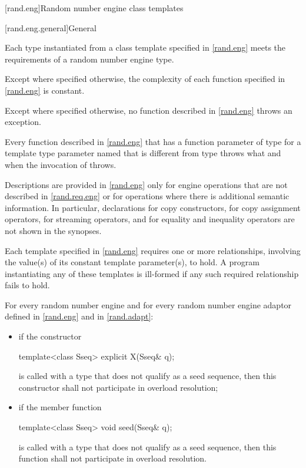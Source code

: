 [rand.eng]{Random number engine class templates}%

[rand.eng.general]{General}%

\pnum
Each type instantiated
from a class template specified in \ref{rand.eng}
meets the requirements
of a random number engine type.

\pnum
Except where specified otherwise,
the complexity of each function
specified in \ref{rand.eng}
is constant.

\pnum
Except where specified otherwise,
no function described in \ref{rand.eng}
throws an exception.

\pnum
Every function described in \ref{rand.eng}
that has a function parameter  of type 
for a template type parameter named 
that is different from type 
throws what and when the invocation of  throws.

\pnum
Descriptions are provided in \ref{rand.eng}
only for engine operations
that are not described in \ref{rand.req.eng}
or for operations where there is additional semantic information.
In particular,
declarations for copy constructors,
for copy assignment operators,
for streaming operators,
and for equality and inequality operators
are not shown in the synopses.

\pnum
Each template specified in \ref{rand.eng}
requires one or more relationships,
involving the value(s) of its constant template parameter(s), to hold.
A program instantiating any of these templates
is ill-formed
if any such required relationship fails to hold.

\pnum
For every random number engine and for every random number engine adaptor 
defined in \ref{rand.eng} and in \ref{rand.adapt}:
\begin{itemize}
\item
if the constructor
\begin{codeblock}
template<class Sseq> explicit X(Sseq& q);
\end{codeblock}
is called with a type  that does not qualify as a seed sequence, then this
constructor shall not participate in overload resolution;

\item
if the member function
\begin{codeblock}
template<class Sseq> void seed(Sseq& q);
\end{codeblock}
is called with a type  that does not qualify as a seed sequence, then this
function shall not participate in overload resolution.
\end{itemize}

